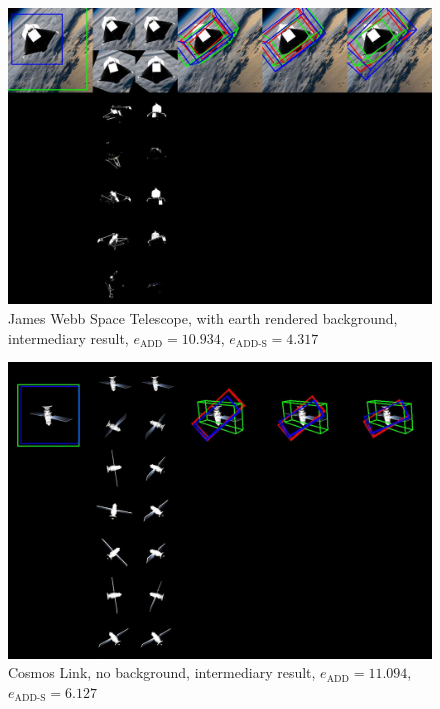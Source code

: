 \begin{figure}[ht]
  \centering
  \includegraphics[width=\textwidth]{data/fig12.jpg}
  \caption{James Webb Space Telescope, with earth rendered background, intermediary result, $e_\mathrm{ADD}=10.934$, $e_{\mathrm{ADD}\text{-}\mathrm{S}}=4.317$}
  \label{fig:fig12}
\end{figure}

\begin{figure}[ht]
  \centering
  \includegraphics[width=\textwidth]{data/fig13.jpg}
  \caption{Cosmos Link, no background, intermediary result, $e_\mathrm{ADD}=11.094$, $e_{\mathrm{ADD}\text{-}\mathrm{S}}=6.127$}
  \label{fig:fig13}
\end{figure}

